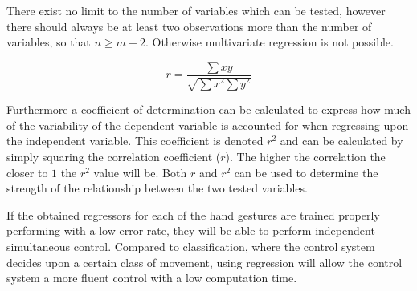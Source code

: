 There exist no limit to the number of variables which can be tested, however there should always be at least two observations more than the number of variables, so that $n \geq m+2$. Otherwise multivariate regression is not possible. \cite{zar2009}


\begin{equation}
r = \frac{\sum xy}{\sqrt{\sum x^{2} \sum y^{2}}}
\end{equation}

Furthermore a coefficient of determination can be calculated to express how much of the variability of the dependent variable is accounted for when regressing upon the independent variable. This coefficient is denoted $r^{2}$ and can be calculated by simply squaring the correlation coefficient ($r$). The higher the correlation the closer to $1$ the $r^2$ value will be. 
Both $r$ and $r^{2}$ can be used to determine the strength of the relationship between the two tested variables. \cite{zar2009}

If the obtained regressors for each of the hand gestures are trained properly performing with a low error rate, they will be able to perform independent simultaneous control. Compared to classification, where the control system decides upon a certain class of movement, using regression will allow the control system a more fluent control with a low computation time. \cite{hahne2014}





